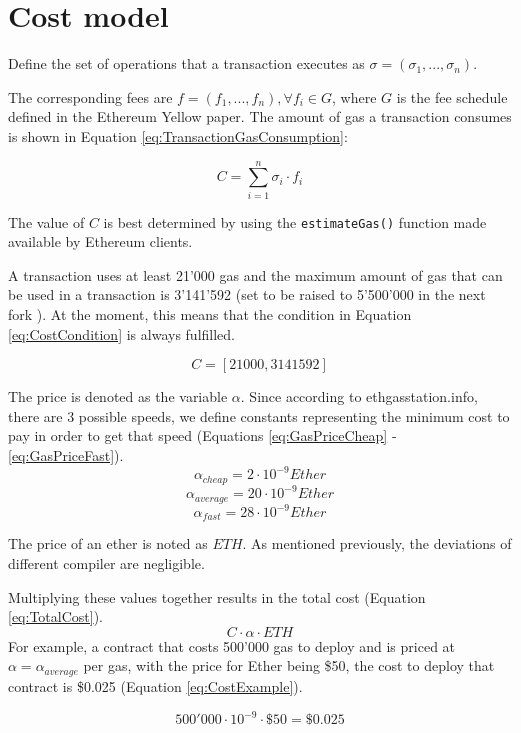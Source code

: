 \section{Cost model}

Define the set of operations that a transaction executes as $ \sigma = (\sigma_1, ..., \sigma_n) $.

The corresponding fees are $ f = (f_1, ..., f_n), \forall f_i \in G $, where $ G $ is the fee schedule defined in the Ethereum Yellow paper. The amount of gas a transaction consumes is shown in Equation \ref{eq:TransactionGasConsumption}:

\begin{equation}
C = \sum_{i = 1}^n \sigma_i \cdot f_i
\label{eq:TransactionGasConsumption}
\end{equation}

The value of $ C $ is best determined by using the \texttt{estimateGas()} function made available by Ethereum clients.

A transaction uses at least 21'000 gas and the maximum amount of gas that can be used in a transaction is 3'141'592 (set to be raised to 5'500'000 in the next fork \cite{EIP150}). At the moment, this means that the condition in Equation \ref{eq:CostCondition} is always fulfilled.

\begin{equation}
    C = [21000, 3141592]
    \label{eq:CostCondition}
\end{equation}

The price is denoted as the variable $ \alpha $. Since according to ethgasstation.info, there are 3 possible speeds, we define constants representing the minimum cost to pay in order to get that speed (Equations \ref{eq:GasPriceCheap} - \ref{eq:GasPriceFast}).
\begin{equation}
    \alpha_{cheap} = 2 \cdot 10^{-9} Ether
    \label{eq:GasPriceCheap}
\end{equation}
\begin{equation}
    \alpha_{average} = 20 \cdot 10^{-9} Ether
    \label{eq:GasPriceAverage}
\end{equation}
\begin{equation}
    \alpha_{fast} = 28 \cdot 10^{-9} Ether
    \label{eq:GasPriceFast}
\end{equation}

The price of an ether is noted as $ ETH $. As mentioned previously, the deviations of different compiler are negligible.

Multiplying these values together results in the total cost (Equation \ref{eq:TotalCost}). 
\begin{equation}
 C \cdot \alpha \cdot ETH
 \label{eq:TotalCost}
\end{equation}  For example, a contract that costs 500'000 gas to deploy and is priced at $ \alpha = \alpha_{average} $ per gas, with the price for Ether being \$50, the cost to deploy that contract is \$0.025 (Equation \ref{eq:CostExample}).

\begin{equation}
    500'000 \cdot 10^{-9} \cdot \$50 = \$0.025
    \label{eq:CostExample}
\end{equation}
